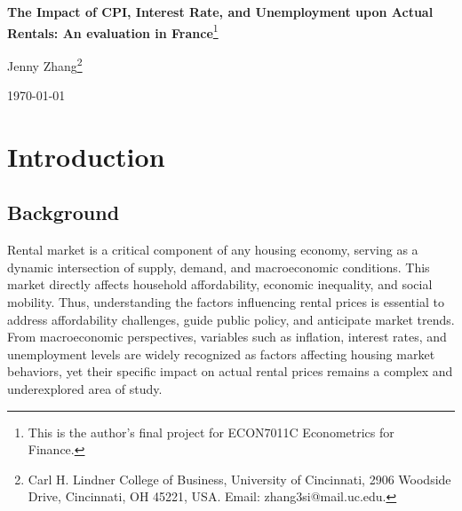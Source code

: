 \documentclass[12pt, times]{article}
\renewcommand{\baselinestretch}{1.5}
\begin{document}
\thispagestyle{empty}
\def\thefootnote{\fnsymbol{footnote}}
\begin{center}
\renewcommand{\baselinestretch}{2}
\vspace*{2in}

{\Large
\textbf{The Impact of CPI, Interest Rate, and Unemployment upon Actual Rentals: An evaluation in France}\footnote{\baselineskip=12pt
This is the author's final project for ECON7011C Econometrics for Finance.}
}
  
{\Large Jenny Zhang\footnote{\baselineskip=12pt
Carl H. Lindner College of Business, University of Cincinnati, 2906 Woodside Drive, Cincinnati, OH 45221, USA. Email: zhang3si@mail.uc.edu.}\\} \vspace{0.2in}

{\Large \today \\}
\vspace{0.5in}
\end{center}


\newpage
\renewcommand{\baselinestretch}{1.5}
\setcounter{page}{1}
\def\thefootnote{\arabic{footnote}}
\setcounter{footnote}{0}

\doublespacing
\section{Introduction}
\vspace{-1.0em}
\subsection{Background}
Rental market is a critical component of any housing economy, serving as a dynamic intersection of supply, demand, and macroeconomic conditions. This market directly affects household affordability, economic inequality, and social mobility. Thus, understanding the factors influencing rental prices is essential to address affordability challenges, guide public policy, and anticipate market trends. From macroeconomic perspectives, variables such as inflation, interest rates, and unemployment levels are widely recognized as factors affecting housing market behaviors, yet their specific impact on actual rental prices remains a complex and underexplored area of study. 
\end{document}
